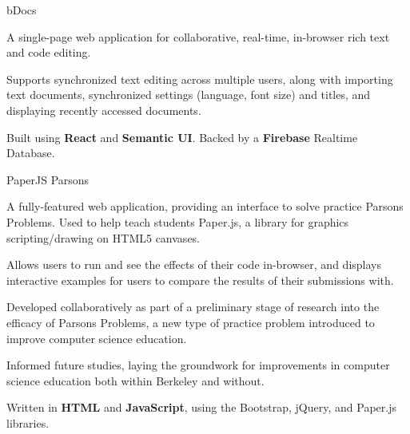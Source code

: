 

\begin{cventries}

  \cventry
    {} %
    {bDocs} %
    {} %
    {} %
    {
      \vspace{-9mm}
      \begin{cvprojectitems}
        \item A single-page web application for collaborative, real-time, in-browser rich text and code editing.
        \item Supports synchronized text editing across multiple users, along with importing text documents, synchronized settings 
        (language, font size) and titles, and displaying recently accessed documents.
        \item Built using \textbf{React} and \textbf{Semantic UI}. Backed by a \textbf{Firebase} Realtime Database. 
      \end{cvprojectitems}
    }

  \vspace{-3mm}
  \cventry
    {} %
    {PaperJS Parsons} %
    {} %
    {} %
    {
      \begin{cvprojectitems}
        \vspace{-9mm}
        \item A fully-featured web application, providing an interface to solve practice Parsons Problems. Used to help teach students 
        Paper.js, a library for graphics scripting/drawing on HTML5 canvases.
        \item Allows users to run and see the effects of their code in-browser, and displays interactive examples 
        for users to compare the results of their submissions with.
        \item Developed collaboratively as part of a preliminary stage of research into the efficacy of Parsons Problems, 
        a new type of practice problem introduced to improve computer science education.
        \item Informed future studies, laying the groundwork for improvements in computer science education both within Berkeley and without.
        \item Written in \textbf{HTML} and \textbf{JavaScript}, using the Bootstrap, jQuery, and Paper.js libraries.
      \end{cvprojectitems}
    }
\end{cventries}
